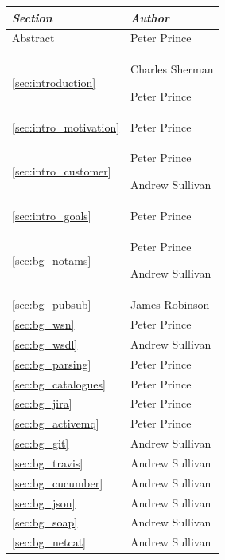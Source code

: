 \documentclass[a4paper, 12pt, twoside]{article}
\newcommand*{\fullref}[1]{\ref{#1} \nameref{#1}}
\begin{document}
\begin{tabularx}{\textwidth}{|X|X|} \hline
  \emph{Section}                         & \emph{Author}                      \\ \hline
  Abstract         & Peter Prince                       \\ \hline
  \fullref{sec:introduction}             & Charles Sherman\par Peter Prince   \\ \hline
  \fullref{sec:intro_motivation}         & Peter Prince                       \\
  \fullref{sec:intro_customer}           & Peter Prince\par Andrew Sullivan  \\
  \fullref{sec:intro_goals}              & Peter Prince                       \\ \hline
  \fullref{sec:bg_notams}                & Peter Prince\par Andrew Sullivan   \\
  \fullref{sec:bg_pubsub}                & James Robinson                     \\
  \fullref{sec:bg_wsn}                   & Peter Prince                       \\
  \fullref{sec:bg_wsdl}						& Andrew Sullivan 				\\
  \fullref{sec:bg_parsing}               & Peter Prince                       \\
  \fullref{sec:bg_catalogues}            & Peter Prince                       \\
  \fullref{sec:bg_jira}                  & Peter Prince                       \\
  \fullref{sec:bg_activemq}              & Peter Prince                       \\
  \fullref{sec:bg_git}                   & Andrew Sullivan                    \\
  \fullref{sec:bg_travis}                & Andrew Sullivan                    \\
  \fullref{sec:bg_cucumber}              & Andrew Sullivan                    \\
  \fullref{sec:bg_json}                  & Andrew Sullivan                    \\
  \fullref{sec:bg_soap}                  & Andrew Sullivan                    \\
  \fullref{sec:bg_netcat}                & Andrew Sullivan                    \\

\end{tabularx}
\end{document}
